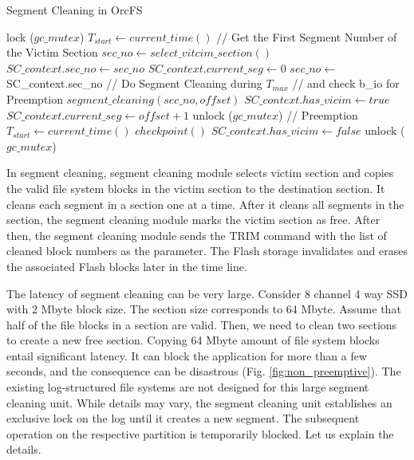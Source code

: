 \documentclass[pageno]{jpaper}
\begin{document}
 \begin{algorithm}[t]
 \caption{Segment Cleaning in OrcFS}
 \label{pseudo:qpsc}
 \begin{algorithmic}[1]
 \small
 \State lock ($gc\_mutex$)
 \State $T_{start} \gets current\_time()$
 \State // Get the First Segment Number of the Victim Section
 \State $sec\_no \gets select\_vitcim\_section()$
 \State $SC\_context.sec\_no \gets sec\_no$
 \State $SC\_context.current\_seg \gets $0
 \Else
 \State $sec\_no \gets $SC\_context.sec\_no
 \EndIf
 \State // Do Segment Cleaning during $T_{max}$
 \State // and check b\_io for Preemption
 \State $segment\_cleaning(sec\_no, offset)$ 
 \State $SC\_context.has\_vicim \gets true$
 \State $SC\_context.current\_seg \gets offset+1$
 \State unlock ($gc\_mutex$)
 \State \Return // Preemption
 \Else
 \State $T_{start} \gets current\_time()$
 \EndIf
 \EndIf
 \EndFor
 \State $checkpoint()$
 \EndIf
 \State $SC\_context.has\_vicim \gets false$
 \State unlock ($gc\_mutex$)
 \State \Return
 \EndFunction
 \end{algorithmic}
\end{algorithm}

In segment cleaning, segment cleaning module selects victim section
and copies the valid file system blocks in the victim section to the
destination section.  It cleans each segment in a section one at a
time. After it cleans all segments in the section, the segment
cleaning module marks the victim section as free.  After then, the
segment cleaning module sends the TRIM command \cite{shu2007data} with
the list of cleaned block numbers as the parameter. The Flash storage
invalidates and erases the associated Flash blocks later in the time
line.

The latency of segment cleaning can be very large. Consider 8 channel
4 way SSD with 2 Mbyte block size. The section size corresponds to 64
Mbyte. Assume that half of the file blocks in a section are
valid. Then, we need to clean two sections to create a new free
section. Copying 64 Mbyte amount of file system blocks entail
significant latency. It can block the application for more than a few
seconds, and the consequence can be disastrous
(Fig. \ref{fig:non_preemptive}).  The existing log-structured
file systems are not designed for this large segment cleaning
unit. While details may vary, the segment cleaning unit establishes an
exclusive lock on the log until it creates a new segment. The
subsequent operation on the respective partition is temporarily
blocked. Let us explain the details.
\end{document}
